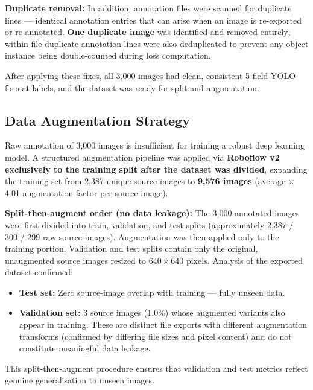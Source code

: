 \textbf{Duplicate removal:} In addition, annotation files were scanned for duplicate lines — identical annotation entries that can arise when an image is re-exported or re-annotated. \textbf{One duplicate image} was identified and removed entirely; within-file duplicate annotation lines were also deduplicated to prevent any object instance being double-counted during loss computation.

After applying these fixes, all 3,000 images had clean, consistent 5-field YOLO-format labels, and the dataset was ready for split and augmentation.

\subsection{Data Augmentation Strategy}

Raw annotation of 3,000 images is insufficient for training a robust deep learning model. A structured augmentation pipeline was applied via \textbf{Roboflow v2} \textbf{exclusively to the training split after the dataset was divided}, expanding the training set from 2,387 unique source images to \textbf{9,576 images} (average $\times$4.01 augmentation factor per source image).

\textbf{Split-then-augment order (no data leakage):} The 3,000 annotated images were first divided into train, validation, and test splits (approximately 2,387 / 300 / 299 raw source images). Augmentation was then applied only to the training portion. Validation and test splits contain only the original, unaugmented source images resized to $640\times640$ pixels. Analysis of the exported dataset confirmed:
\begin{itemize}
    \item \textbf{Test set:} Zero source-image overlap with training — fully unseen data.
    \item \textbf{Validation set:} 3 source images (1.0\%) whose augmented variants also appear in training. These are distinct file exports with different augmentation transforms (confirmed by differing file sizes and pixel content) and do not constitute meaningful data leakage.
\end{itemize}
This split-then-augment procedure ensures that validation and test metrics reflect genuine generalisation to unseen images.

